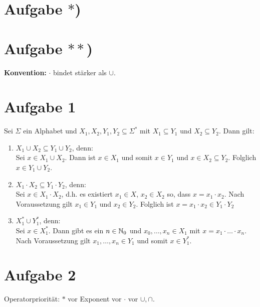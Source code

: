 \documentclass[12pt,a4paper]{article}
\author{Willi Sontopski}
\begin{document}

\section*{Aufgabe $\ast$)}

\section*{Aufgabe $\ast\ast$)}
\textbf{Konvention:} $\cdot$ bindet stärker als $\cup$.

\section*{Aufgabe 1}
Sei $\Sigma$ ein Alphabet und $X_1,X_2,Y_1,Y_2\subseteq\Sigma^\ast$ mit $X_1\subseteq Y_1$ und $X_2\subseteq Y_2$. Dann gilt:
\begin{enumerate}
\item $X_1\cup X_2\subseteq Y_1\cup Y_2$, denn:\\
Sei $x\in X_1\cup X_2$. Dann ist $x\in X_1$ und somit $x\in Y_1$ und $x\in X_2\subseteq Y_2$. Folglich $x\in Y_1\cup Y_2$.
\item $X_1\cdot X_2\subseteq Y_1\cdot Y_2$, denn:\\
Sei $x\in X_1\cdot X_2$, d.h. es existiert $x_1\in X$, $x_2\in X_2$ so, dass $x=x_1\cdot x_2$. Nach Voraussetzung gilt $x_1\in Y_1$ und $x_2\in Y_2$. Folglich ist $x=x_1\cdot x_2\in Y_1\cdot Y_2$
\item $X_1^\ast\cup Y_1^\ast$, denn:\\
Sei $x\in X_1^\ast$. Dann gibt es ein $n\in\mathbb{N}_0$ und $x_0,\ldots, x_n\in X_1$ mit $x=x_1\cdot\ldots\cdot x_n$. Nach Voraussetzung gilt $x_1,\ldots,x_n\in Y_1$ und somit $x\in Y_1^\ast$.
\end{enumerate}

\section*{Aufgabe 2}
Operatorpriorität: $\ast$ vor Exponent vor $\cdot$ vor $\cup,\cap$.
\end{document}
